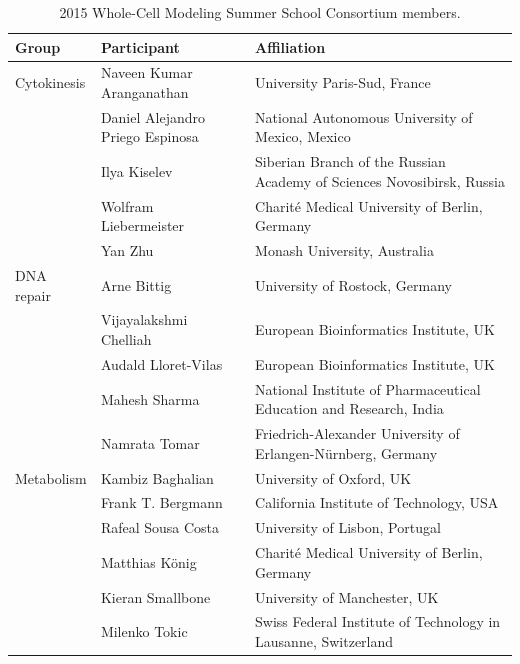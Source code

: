 \documentclass[journal,transmag]{IEEEtran}
\begin{document}
\begin{table}[ht!]
\caption{2015 Whole-Cell Modeling Summer School Consortium members.}
\begin{tabularx}{\textwidth}{l||l||X}\hline
\bfseries Group        & \bfseries Participant            & \bfseries Affiliation\\\hline\hline
Cytokinesis            & Naveen Kumar Aranganathan        & University Paris-Sud, France\\
                       & Daniel Alejandro Priego Espinosa & National Autonomous University of Mexico, Mexico\\
                       & Ilya Kiselev                     & Siberian Branch of the Russian Academy of Sciences Novosibirsk, Russia\\
                       & Wolfram Liebermeister            & Charit\'e Medical University of Berlin, Germany\\
                       & Yan Zhu                          & Monash University, Australia\\\hline
DNA repair             & Arne Bittig                      & University of Rostock, Germany\\
                       & Vijayalakshmi Chelliah           & European Bioinformatics Institute, UK\\
                       & Audald Lloret-Vilas              & European Bioinformatics Institute, UK\\
                       & Mahesh Sharma                    & National Institute of Pharmaceutical Education and Research, India\\
                       & Namrata Tomar                    & Friedrich-Alexander University of Erlangen-N\"urnberg, Germany\\\hline
Metabolism             & Kambiz Baghalian                 & University of Oxford, UK\\
                       & Frank T. Bergmann                & California Institute of Technology, USA\\
                       & Rafeal Sousa Costa               & University of Lisbon, Portugal\\
                       & Matthias K\"onig                 & Charit\'e Medical University of Berlin, Germany\\
                       & Kieran Smallbone                 & University of Manchester, UK\\
                       & Milenko Tokic                    & Swiss Federal Institute of Technology in Lausanne, Switzerland\\\hline

\end{tabularx}
\end{table}
\end{document}
